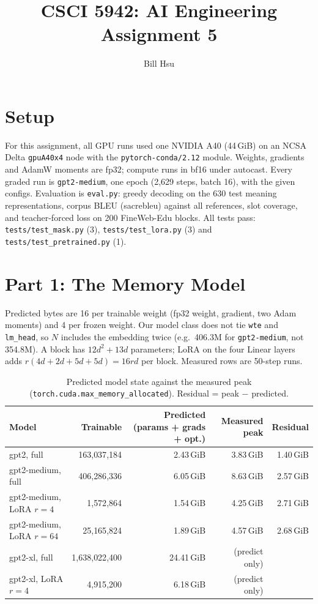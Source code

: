 \documentclass[10pt]{article}
\begin{document}
\title{CSCI 5942: AI Engineering Assignment 5}
\author{Bill Hsu}
\maketitle

\section*{Setup}

For this assignment, all GPU runs used one NVIDIA A40 (44\,GiB) 
on an NCSA Delta
\texttt{gpuA40x4} node with the \texttt{pytorch-conda/2.12} module.
Weights, gradients and AdamW moments are fp32; compute runs in bf16
under autocast. Every graded run is \texttt{gpt2-medium}, one epoch
(2{,}629 steps, batch 16), with the given configs. Evaluation is
\texttt{eval.py}: greedy decoding on the 630 test meaning
representations, corpus BLEU (sacrebleu) against all references, slot
coverage, and teacher-forced loss on 200 FineWeb-Edu blocks. All tests
pass: \texttt{tests/test\_mask.py} (3), \texttt{tests/test\_lora.py} (3)
and \texttt{tests/test\_pretrained.py} (1).

\section*{Part 1: The Memory Model}

Predicted bytes are 16 per trainable weight (fp32 weight, gradient, two
Adam moments) and 4 per frozen weight. Our model class does not tie
\texttt{wte} and \texttt{lm\_head}, so $N$ includes the embedding twice
(e.g.\ 406.3M for \texttt{gpt2-medium}, not 354.8M). A block has
$12d^2 + 13d$ parameters; LoRA on the four Linear layers adds
$r(4d + 2d + 5d + 5d) = 16rd$ per block. Measured rows are 50-step runs.

\begin{table}[htbp]
\caption{Predicted model state against the measured peak
(\texttt{torch.cuda.max\_memory\_allocated}). Residual = peak $-$ predicted.}
\label{tab:mem}
\centering
\begin{tabular}{lrrrr}
\toprule
Model & Trainable & Predicted (params + grads + opt.) & Measured peak & Residual \\
\midrule
gpt2, full                & 163{,}037{,}184   & 2.43\,GiB  & 3.83\,GiB & 1.40\,GiB \\
gpt2-medium, full         & 406{,}286{,}336   & 6.05\,GiB  & 8.63\,GiB & 2.57\,GiB \\
gpt2-medium, LoRA $r=4$   & 1{,}572{,}864     & 1.54\,GiB  & 4.25\,GiB & 2.71\,GiB \\
gpt2-medium, LoRA $r=64$  & 25{,}165{,}824    & 1.89\,GiB  & 4.57\,GiB & 2.68\,GiB \\
gpt2-xl, full             & 1{,}638{,}022{,}400 & 24.41\,GiB & (predict only) & \\
gpt2-xl, LoRA $r=4$       & 4{,}915{,}200     & 6.18\,GiB  & (predict only) & \\
\bottomrule
\end{tabular}
\end{table}
\end{document}
